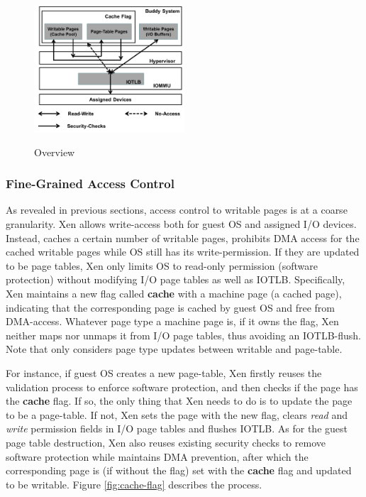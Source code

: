 \begin{figure}[ht]
\centering
\includegraphics[width=0.5\textwidth]{image/overview/overview.png} \\
\caption{Overview}
\label{fig:overview}
\end{figure}

\subsubsection{Fine-Grained Access Control}
As revealed in previous sections, access control to writable pages is at a coarse granularity. Xen allows write-access both for guest OS and assigned I/O devices. Instead, \name caches a certain number of writable pages, prohibits DMA access for the cached writable pages while OS still has its write-permission. If they are updated to be page tables, Xen only limits OS to read-only permission (software protection) without modifying I/O page tables as well as IOTLB. Specifically, Xen maintains a new flag called \textbf{cache} with a machine page (a cached page), indicating that the corresponding page is cached by guest OS and free from DMA-access. Whatever page type a machine page is, if it owns the flag, Xen neither maps nor unmaps it from I/O page tables, thus avoiding an IOTLB-flush. Note that \name only considers page type updates between writable and page-table.

For instance, if guest OS creates a new page-table, Xen firstly reuses the validation process to enforce software protection, and then checks if the page has the \textbf{cache} flag. If so, the only thing that Xen needs to do is to update the page to be a page-table. If not, Xen sets the page with the new flag, clears \emph{read} and \emph{write} permission fields in I/O page tables and flushes IOTLB. As for the guest page table destruction, Xen also reuses existing security checks to remove software protection while maintains DMA prevention, after which the corresponding page is (if without the flag) set with the \textbf{cache} flag and updated to be writable. Figure \ref{fig:cache-flag} describes the process.

